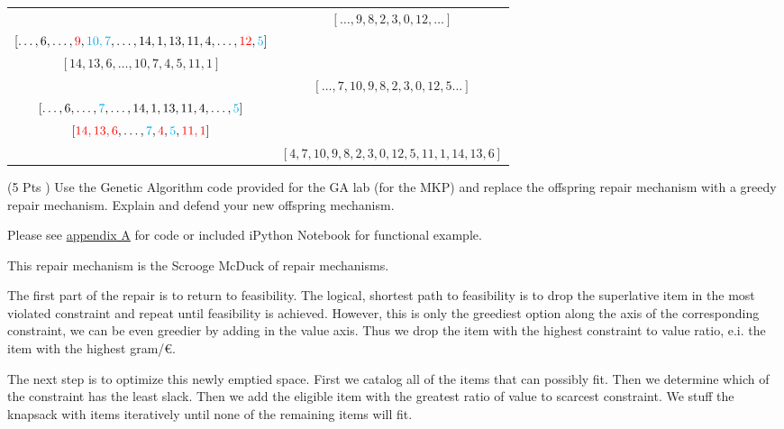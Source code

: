 \documentclass[12pt,letterpaper]{exam}
\begin{document}
\begin{questions}
\begin{solution}
\begin{parts}
\begin{center}
\begin{tabular}{cc}
						& \( [\ldots, 9,8,2,3,0,12, \ldots] \) \\
						
						\([\ldots,6,\ldots,\textcolor{red}{9},\textcolor{cyan}{10,7},\ldots,14,1,13,11,4,\ldots,\textcolor{red}{12},\textcolor{cyan}{5}]\) & \\
						\([14,13,6,\ldots,10,7,4,5,11,1]\) & \\
						
						& \( [\ldots, 7,10,9,8,2,3,0,12,5 \ldots] \) \\
						\([\ldots,6,\ldots,\textcolor{cyan}{7},\ldots,14,1,13,11,4,\ldots,\textcolor{cyan}{5}]\) & \\
						\([\textcolor{red}{14,13,6},\ldots,\textcolor{cyan}{7},\textcolor{red}{4},\textcolor{cyan}{5},\textcolor{red}{11,1}]\) & \\
						
						& \( [ 4,7,10,9,8,2,3,0,12,5,11,1,14,13,6 ] \) \\
					\end{tabular}
				\end{center}
				
			\end{parts}
			
		\end{solution}
		
		\question 
		(5 Pts )  Use the Genetic Algorithm code provided for the GA lab (for the MKP) and replace the offspring repair mechanism with a greedy repair mechanism.  Explain and defend your new offspring mechanism.
		
		\begin{solution}
			Please see \hyperref[appendix:ipynb]{appendix A} for code or included iPython Notebook for functional example.
			
			This repair mechanism is the Scrooge McDuck of repair mechanisms.
			
			The first part of the repair is to return to feasibility. 
			The logical, shortest path to feasibility is to drop the superlative item in the most violated constraint and repeat until feasibility is achieved.
			However, this is only the greediest option along the axis of the corresponding constraint, we can be even greedier by adding in the value axis. 
			Thus we drop the item with the highest constraint to value ratio, e.i. the item with the highest gram/€.
			
			The next step is to optimize this newly emptied space.
			First we catalog all of the items that can possibly fit.
			Then we determine which of the constraint has the least slack.
			Then we add the eligible item with the greatest ratio of value to scarcest constraint.
			We stuff the knapsack with items iteratively until none of the remaining items will fit.
		\end{solution}
		
	\end{questions}
	
\end{document}

